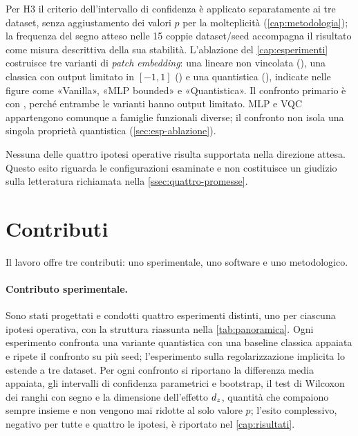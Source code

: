 Per H3 il criterio dell'intervallo di confidenza è applicato separatamente ai tre
dataset, senza aggiustamento dei valori $p$ per la molteplicità
(\cref{cap:metodologia}); la frequenza del segno atteso nelle 15 coppie
dataset/seed accompagna il risultato come misura descrittiva della sua stabilità.
L'ablazione del
\cref{cap:esperimenti} costruisce tre varianti di \emph{patch embedding}: una
lineare non vincolata (), una classica con output limitato in
$[-1,1]$ () e una quantistica (), indicate
nelle figure come «Vanilla», «MLP bounded» e «Quantistica». Il confronto primario
è con , perché entrambe le varianti hanno output limitato. MLP e VQC appartengono comunque a famiglie funzionali diverse;
il confronto non isola una singola proprietà quantistica
(\cref{sec:esp-ablazione}).

Nessuna delle quattro ipotesi operative risulta supportata nella direzione
attesa. Questo esito riguarda le configurazioni esaminate e non costituisce un
giudizio sulla letteratura richiamata nella \cref{ssec:quattro-promesse}.

\section{Contributi}
\label{sec:contributi}

Il lavoro offre tre contributi: uno sperimentale, uno software e uno
metodologico.

\paragraph{Contributo sperimentale.} Sono stati progettati e condotti quattro
esperimenti distinti, uno per ciascuna ipotesi operativa, con la struttura
riassunta nella \cref{tab:panoramica}. Ogni esperimento confronta una variante
quantistica con una baseline classica appaiata e ripete il confronto su più seed;
l'esperimento sulla regolarizzazione implicita lo estende a tre dataset. Per ogni
confronto si riportano la differenza media appaiata, gli intervalli di confidenza
parametrici e bootstrap, il test di Wilcoxon dei ranghi con segno e la dimensione
dell'effetto $d_z$, quantità che compaiono sempre insieme e non vengono mai
ridotte al solo valore $p$; l'esito complessivo, negativo per tutte e quattro le
ipotesi, è riportato nel \cref{cap:risultati}.

